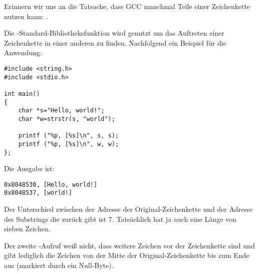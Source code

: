 \label{strstr_example}

Erinnern wir uns an die Tatsache, dass GCC manchmal Teile einer Zeichenkette nutzen kann: .

Die  \CCpp-Standard-Bibliotheksfunktion wird genutzt um das Auftreten einer Zeichenkette
in einer anderen zu finden.
Nachfolgend ein Beispiel für die Anwendung:

\begin{lstlisting}[style=customc]
#include <string.h>
#include <stdio.h>

int main()
{
	char *s="Hello, world!";
	char *w=strstr(s, "world");

	printf ("%p, [%s]\n", s, s);
	printf ("%p, [%s]\n", w, w);
};
\end{lstlisting}

Die Ausgabe ist:

\begin{lstlisting}
0x8048530, [Hello, world!]
0x8048537, [world!]
\end{lstlisting}

Der Unterschied zwischen der Adresse der Original-Zeichenkette und der Adresse des Substrings die
 zurück gibt ist 7.
Tatsächlich hat  ja auch eine Länge von sieben Zeichen.

Der zweite \printf-Aufruf weiß nicht, dass weitere Zeichen vor der Zeichenkette sind und gibt lediglich die
Zeichen von der Mitte der Original-Zeichenkette bis zum Ende aus (markiert durch ein Null-Byte).

